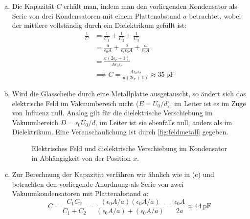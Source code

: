 \begin{enumerate}[(a)]
\item Die Kapazität $C$ erhält man, indem man den vorliegenden Kondensator als Serie von drei Kondensatoren mit einem Plattenabstand $a$ betrachtet, wobei der mittlere vollständig durch ein Dielektrikum gefüllt ist:
\begin{align}
\frac{1}{C} &= \frac{1}{C_1} + \frac{1}{C_2} + \frac{1}{C_3} \\
			&= \frac{a}{\epsilon_0 A} + \frac{a}{\epsilon_r \epsilon_0 A} + \frac{a}{\epsilon_0 A}\\
			&= \frac{a(2\epsilon_r+1)}{A\epsilon_0 \epsilon_r} \\
			&\implies C = \frac{A\epsilon_0 \epsilon_r}{a(2\epsilon_r+1)} \approx \SI{35}{\pico\farad}
\end{align}
\item Wird die Glasscheibe durch eine Metallplatte ausgetauscht, so ändert sich das elektrische Feld im Vakuumbereich nicht ($E=U_0/d$), im Leiter ist es im Zuge von Influenz null. Analog gilt für die dielektrische Verschiebung im Vakuumbereich $D=\epsilon_0U_0/d$, im Leiter ist sie ebenfalls null, anders als im Dielektrikum. Eine Veranschaulichung ist durch \vref{fig:feldmetall} gegeben.

\begin{figure}[htbp]
\centering
{}
\caption{Elektrisches Feld und dielektrische Verschiebung im Kondensator in Abhängigkeit von der Position $x$.}
\label{fig:feldmetall}
\end{figure}

\item Zur Berechnung der Kapazität verfähren wir ähnlich wie in (c) und betrachten den vorliegende Anordnung als Serie von zwei Vakuumkondensatoren mit Plattenabstand $a$:
\begin{equation}
C= \frac{C_1 C_2}{C_1 +C_2} = \frac{(\epsilon_0 A /a)(\epsilon_0 A /a)}{(\epsilon_0 A /a)+(\epsilon_0 A /a)} = \frac{\epsilon_0 A}{2a} \approx \SI{44}{\pico\farad}
\end{equation}

\end{enumerate}